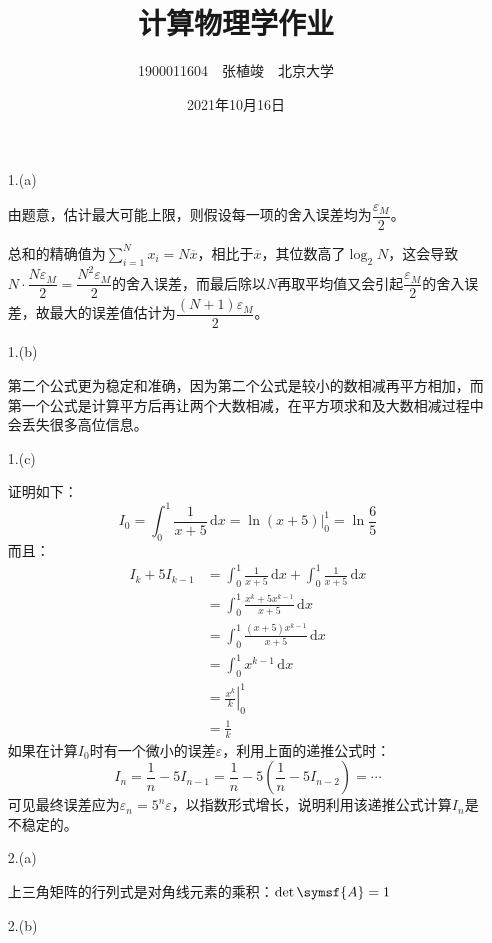 \documentclass[a4paper]{article}
\renewcommand\epsilon{\varepsilon}
\renewcommand\mathsf{\symsf}
\begin{document}
\title{\textbf{计算物理学作业}}
\author{1900011604\ \ 张植竣\ \ 北京大学}
\date{2021年10月16日}
\maketitle

\begin{enumerate}

\item[1.(a)]

由题意，估计最大可能上限，则假设每一项的舍入误差均为$\dfrac{\epsilon_M}{2}$。

总和的精确值为$\sum\limits_{i=1}^N x_i=N\overline{x}$，相比于$\overline{x}$，其位数高了$\log_{2}N$，这会导致$N\cdot\dfrac{N\epsilon_M}{2}=\dfrac{N^2\epsilon_M}{2}$的舍入误差，而最后除以$N$再取平均值又会引起$\dfrac{\epsilon_M}{2}$的舍入误差，故最大的误差值估计为$\dfrac{(N+1)\epsilon_M}{2}$。

\item[1.(b)]

第二个公式更为稳定和准确，因为第二个公式是较小的数相减再平方相加，而第一个公式是计算平方后再让两个大数相减，在平方项求和及大数相减过程中会丢失很多高位信息。

\item[1.(c)]

证明如下：
\[
    I_0 = \int_0^1 \frac{1}{x+5}\,\mathrm{d}x = \left.\ln(x+5)\right|_0^1 = \ln\frac{6}{5}
\]
而且：
\begin{align*}
    I_k + 5I_{k-1}
    &= \int_0^1 \frac{1}{x+5}\,\mathrm{d}x + \int_0^1 \frac{1}{x+5}\,\mathrm{d}x \\
    &= \int_0^1 \frac{x^k + 5x^{k-1}}{x+5}\,\mathrm{d}x \\
    &= \int_0^1 \frac{(x+5)x^{k-1}}{x+5}\,\mathrm{d}x \\
    &= \int_0^1 x^{k-1}\,\mathrm{d}x \\
    &= \left.\frac{x^k}{k}\right|_0^1 \\
    &= \frac{1}{k}
\end{align*}
如果在计算$I_0$时有一个微小的误差$\epsilon$，利用上面的递推公式时：
\[
    I_n = \frac{1}{n} - 5I_{n-1} = \frac{1}{n} - 5\left(\frac{1}{n}-5I_{n-2}\right) = \cdots
\]
可见最终误差应为$\epsilon_n=5^n\epsilon$，以指数形式增长，说明利用该递推公式计算$I_n$是不稳定的。

\item[2.(a)]

上三角矩阵的行列式是对角线元素的乘积：$\det\mathsf{A}=1$

\item[2.(b)]


\end{enumerate}
\end{document}
